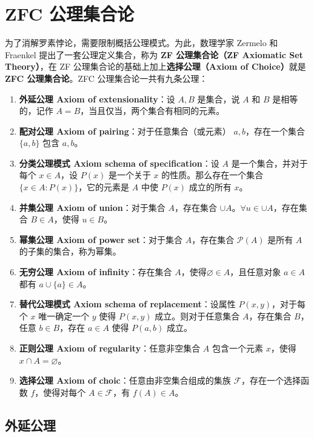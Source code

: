 \section{ZFC 公理集合论}

为了消解罗素悖论，需要限制概括公理模式。为此，数理学家 Zermelo 和 Fraenkel 提出了一套公理定义集合，称为 \textbf{ZF 公理集合论（ZF Axiomatic Set Theory）}，在 ZF 公理集合论的基础上加上\textbf{选择公理（Axiom of Choice）}就是 \textbf{ZFC 公理集合论}。ZFC 公理集合论一共有九条公理：

\begin{enumerate}
    \item \textbf{外延公理 Axiom of extensionality}：设 $A,B$ 是集合，说 $A$ 和 $B$ 是相等的，记作 $A = B$，当且仅当，两个集合有相同的元素。
    \item \textbf{配对公理 Axiom of pairing}：对于任意集合（或元素） $a,b$，存在一个集合 $\{a,b\}$ 包含 $a,b$。
    \item \textbf{分类公理模式 Axiom schema of specification}：设 $ A $ 是一个集合，并对于每个 $ x\in A $，设 $ P(x) $ 是一个关于 $ x $ 的性质。那么存在一个集合 $ \{x\in A:P(x)\} $，它的元素是 $ A $ 中使 $ P(x) $ 成立的所有 $x$。
    \item \textbf{并集公理 Axiom of union}：对于集合 $ A $，存在集合 $ \cup A $。$ \forall u \in \cup A $，存在集合 $ B\in A $，使得 $ u\in B $。
    \item \textbf{幂集公理 Axiom of power set}：对于集合 $ A $，存在集合 $ \mathcal{P}(A) $ 是所有 $ A $ 的子集的集合，称为幂集。
    \item \textbf{无穷公理 Axiom of infinity}：存在集合 $ A $，使得$ \varnothing \in A $，且任意对象 $ a\in A $ 都有 $ a\cup \{a\}\in A $。
    \item \textbf{替代公理模式 Axiom schema of replacement}：设属性 $ P(x,y) $，对于每个 $ x $ 唯一确定一个 $ y $ 使得 $ P(x,y) $ 成立。则对于任意集合 $ A $，存在集合 $ B $，任意 $  b\in B $，存在 $ a\in A $ 使得 $ P(a,b) $ 成立。
    \item \textbf{正则公理 Axiom of regularity}：任意非空集合 $ A $ 包含一个元素 $ x  $，使得 $ x\cap A = \varnothing $。
    \item \textbf{选择公理 Axiom of choic}：任意由非空集合组成的集族 $ \mathcal{F} $，存在一个选择函数 $ f $，使得对每个 $ A\in\mathcal{F} $，有 $ f(A)\in A $。
\end{enumerate}

\subsection{外延公理}

